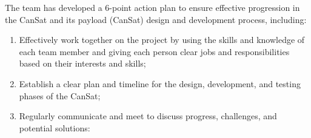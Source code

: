 The team has developed a 6-point action plan to ensure effective progression in the CanSat and its payload (CanSat) design and development process, including:
\begin{enumerate}[topsep=3pt]
    \item Effectively work together on the project by using the skills and knowledge of each team member and giving each person clear jobs and responsibilities based on their interests and skills;
    \item Establish a clear plan and timeline for the design, development, and testing phases of the CanSat;
    \item Regularly communicate and meet to discuss progress, challenges, and potential solutions:

\end{enumerate}
